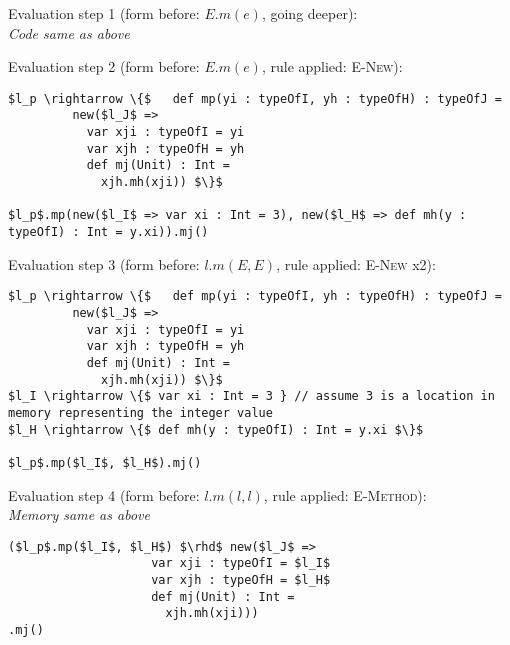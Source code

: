 \documentclass{llncs}
\begin{document}
\vspace{12pt}
\noindent Evaluation step 1 (form before: $E.m(e)$, going deeper):\\
\indent\textit{Code same as above}

\vspace{12pt}
\noindent Evaluation step 2 (form before: $E.m(e)$, rule applied: \textsc{E-New}):
\vspace{-6pt}
\begin{lstlisting}[xleftmargin=20pt]
$l_p \rightarrow \{$   def mp(yi : typeOfI, yh : typeOfH) : typeOfJ =
         new($l_J$ =>
           var xji : typeOfI = yi
           var xjh : typeOfH = yh
           def mj(Unit) : Int =
             xjh.mh(xji)) $\}$

$l_p$.mp(new($l_I$ => var xi : Int = 3), new($l_H$ => def mh(y : typeOfI) : Int = y.xi)).mj()
\end{lstlisting}

\vspace{12pt}
\noindent Evaluation step 3 (form before: $l.m(E, E)$, rule applied: \textsc{E-New} x2):
\vspace{-6pt}
\begin{lstlisting}[xleftmargin=20pt]
$l_p \rightarrow \{$   def mp(yi : typeOfI, yh : typeOfH) : typeOfJ =
         new($l_J$ =>
           var xji : typeOfI = yi
           var xjh : typeOfH = yh
           def mj(Unit) : Int =
             xjh.mh(xji)) $\}$
$l_I \rightarrow \{$ var xi : Int = 3 } // assume 3 is a location in memory representing the integer value
$l_H \rightarrow \{$ def mh(y : typeOfI) : Int = y.xi $\}$

$l_p$.mp($l_I$, $l_H$).mj()
\end{lstlisting}

\vspace{12pt}
\noindent Evaluation step 4 (form before: $l.m(l, l)$, rule applied: \textsc{E-Method}):\\
\vspace{-6pt}
\indent\textit{Memory same as above}\\
\vspace{-6pt}
\begin{lstlisting}[xleftmargin=20pt]
($l_p$.mp($l_I$, $l_H$) $\rhd$ new($l_J$ =>
                    var xji : typeOfI = $l_I$
                    var xjh : typeOfH = $l_H$
                    def mj(Unit) : Int =
                      xjh.mh(xji)))
.mj()
\end{lstlisting}
\end{document}
